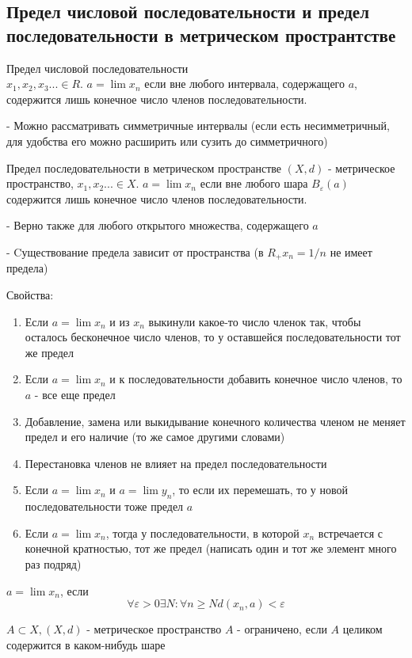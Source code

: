 \subsection{Предел числовой последовательности и предел последовательности в метрическом пространтстве}

    \begin{conj}
        Предел числовой последовательности \\
        $x_1, x_2, x_3 ... \in R$. $a=\lim x_n$ если вне любого интервала, содержащего $a$, содержится лишь конечное число членов последовательности.
    \end{conj}
    \notice -
    Можно рассматривать симметричные интервалы (если есть несимметричный, для удобства его можно расширить или сузить до симметричного)
    
    \begin{conj}
        Предел последовательности в метрическом пространстве
        $(X, d)$ - метрическое пространство, $x_1, x_2 ... \in X$. $a=\lim x_n$ если вне любого шара $B_\varepsilon (a)$ содержится лишь конечное число членов последовательности.
    \end{conj}
    
    \notice -
    Верно также для любого открытого множества, содержащего $a$
    
    \notice -
    Cуществование предела зависит от пространства (в $R_+ x_n = 1/n$ не имеет предела)
    
    \begin{theorem-non}
        Свойства:
        \begin{enumerate}
            \item Если $a=\lim x_n$ и из $x_n$ выкинули какое-то число членок так, чтобы осталось бесконечное число членов, то у оставшейся последовательности тот же предел
            \item Если $a=\lim x_n$ и к последовательности добавить конечное число членов, то $a$ - все еще предел
            \item Добавление, замена или выкидывание конечного количества членом не меняет предел и его наличие (то же самое другими словами)
            \item Перестановка членов не влияет на предел последовательности
            \item Если $a=\lim x_n$ и $a=\lim y_n$, то если их перемешать, то у новой последовательности тоже предел $a$
            \item Если $a=\lim x_n$, тогда у последовательности, в которой $x_n$ встречается с конечной кратностью, тот же предел (написать один и тот же элемент много раз подряд)
        \end{enumerate}
    \end{theorem-non}
    \begin{conj}
        $a=\lim x_n$, если
    \[ \forall \varepsilon>0 \exists N : \forall n\geqslant N d(x_n, a)<\varepsilon\]
    \end{conj}
    \begin{conj}
        $A \subset X, (X, d)$ - метрическое пространство
        $A$ - ограничено, если $A$ целиком содержится в каком-нибудь шаре
    \end{conj}
    
